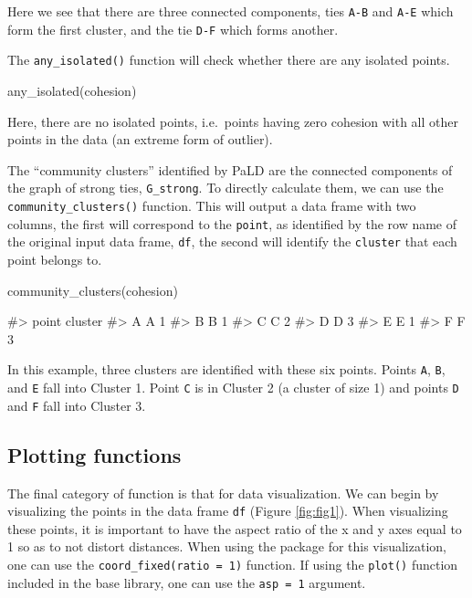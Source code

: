 Here we see that there are three connected components, ties \texttt{A-B}
and \texttt{A-E} which form the first cluster, and the tie \texttt{D-F}
which forms another.

The \texttt{any\_isolated()} function will check whether there are any
isolated points.

\begin{Schunk}
\begin{Sinput}
any_isolated(cohesion)
\end{Sinput}
\end{Schunk}

\noindent Here, there are no isolated points, i.e.~points having zero
cohesion with all other points in the data (an extreme form of outlier).

The ``community clusters'' identified by PaLD are the connected
components of the graph of strong ties, \texttt{G\_strong}. To directly
calculate them, we can use the \texttt{community\_clusters()} function.
This will output a data frame with two columns, the first will
correspond to the \texttt{point}, as identified by the row name of the
original input data frame, \texttt{df}, the second will identify the
\texttt{cluster} that each point belongs to.

\begin{Schunk}
\begin{Sinput}
community_clusters(cohesion)
\end{Sinput}
\begin{Soutput}
#>   point cluster
#> A     A       1
#> B     B       1
#> C     C       2
#> D     D       3
#> E     E       1
#> F     F       3
\end{Soutput}
\end{Schunk}

In this example, three clusters are identified with these six points.
Points \texttt{A}, \texttt{B}, and \texttt{E} fall into Cluster 1. Point
\texttt{C} is in Cluster 2 (a cluster of size 1) and points \texttt{D}
and \texttt{F} fall into Cluster 3.

\hypertarget{plotting-functions}{%
\subsection{Plotting functions}\label{plotting-functions}}

The final category of function is that for data visualization. We can
begin by visualizing the points in the data frame \texttt{df} (Figure
\ref{fig:fig1}). When visualizing these points, it is important to have
the aspect ratio of the x and y axes equal to 1 so as to not distort
distances. When using the  package for this
visualization, one can use the \texttt{coord\_fixed(ratio\ =\ 1)}
function. If using the \texttt{plot()} function included in the base
library, one can use the \texttt{asp\ =\ 1} argument.

